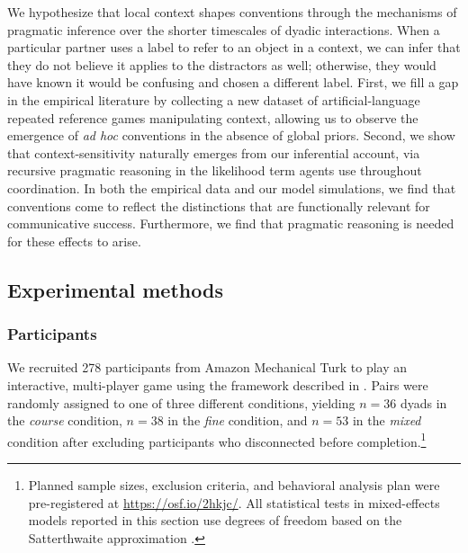 We hypothesize that local context shapes conventions through the mechanisms of pragmatic inference over the shorter timescales of dyadic interactions.
When a particular partner uses a label to refer to an object in a context, we can infer that they do not believe it applies to the distractors as well; otherwise, they would have known it would be confusing and chosen a different label.
First, we fill a gap in the empirical literature by collecting a new dataset of artificial-language repeated reference games manipulating context, allowing us to observe the emergence of \emph{ad hoc} conventions in the absence of global priors.
Second, we show that context-sensitivity naturally emerges from our inferential account, via recursive pragmatic reasoning in the likelihood term agents use throughout coordination.
In both the empirical data and our model simulations, we find that conventions come to reflect the distinctions that are functionally relevant for communicative success. 
Furthermore, we find that pragmatic reasoning is needed for these effects to arise. 

			
\subsection{Experimental methods}

\subsubsection{Participants}

We recruited 278 participants from Amazon Mechanical Turk to play an interactive, multi-player game using the framework described in . Pairs were randomly assigned to one of three different conditions, yielding $n=36$ dyads in the \emph{course} condition, $n=38$ in the \emph{fine} condition, and $n=53$ in the \emph{mixed} condition after excluding participants who disconnected before completion.\footnote{Planned sample sizes, exclusion criteria, and behavioral analysis plan were pre-registered at \url{https://osf.io/2hkjc/}. All statistical tests in mixed-effects models reported in this section use degrees of freedom based on the Satterthwaite approximation \cite{luke2017evaluating}.}

